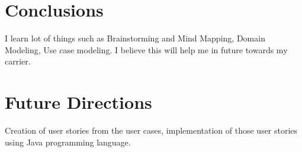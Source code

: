 \section{Conclusions}

I learn lot of things such as Brainstorming and Mind Mapping, Domain Modeling, Use case modeling. I believe this will help me in future towards my carrier.


\section{Future Directions}
Creation of user stories from the user cases, implementation of those user stories using Java programming language.